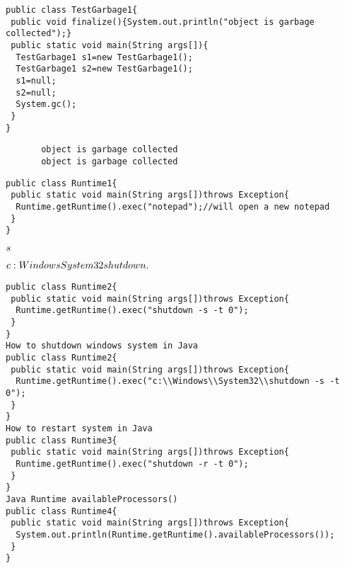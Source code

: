 \documentclass{book}
\def\lthtmlcheckvsize{\ifdim\ht\sizebox<\vsize 
  \ifdim\wd\sizebox<\hsize\expandafter\hfill\fi \expandafter\vfill
  \else\expandafter\vss\fi}%
\begin{document}
{\newpage\clearpage
{}%
\begin{lstlisting}
public class TestGarbage1{  
 public void finalize(){System.out.println("object is garbage collected");}  
 public static void main(String args[]){  
  TestGarbage1 s1=new TestGarbage1();  
  TestGarbage1 s2=new TestGarbage1();  
  s1=null;  
  s2=null;  
  System.gc();  
 }  
}  
\end{lstlisting}%
\lthtmlfigureZ
\lthtmlcheckvsize\clearpage}

{\newpage\clearpage
{}%
\begin{lstlisting}
       object is garbage collected
       object is garbage collected
\end{lstlisting}%
\lthtmlfigureZ
\lthtmlcheckvsize\clearpage}

{\newpage\clearpage
{}%
\begin{lstlisting}
public class Runtime1{  
 public static void main(String args[])throws Exception{  
  Runtime.getRuntime().exec("notepad");//will open a new notepad  
 }  
}  
\end{lstlisting}%
\lthtmlfigureZ
\lthtmlcheckvsize\clearpage}

{\newpage\clearpage
{}%
$\-s$%
\lthtmlindisplaymathZ
\lthtmlcheckvsize\clearpage}

{\newpage\clearpage
{}%
$c:\\Windows\\System32\\shutdown.$%
\lthtmlindisplaymathZ
\lthtmlcheckvsize\clearpage}

{\newpage\clearpage
{}%
\begin{lstlisting}
public class Runtime2{  
 public static void main(String args[])throws Exception{  
  Runtime.getRuntime().exec("shutdown -s -t 0");  
 }  
}  
How to shutdown windows system in Java
public class Runtime2{  
 public static void main(String args[])throws Exception{  
  Runtime.getRuntime().exec("c:\\Windows\\System32\\shutdown -s -t 0");  
 }  
}  
How to restart system in Java
public class Runtime3{  
 public static void main(String args[])throws Exception{  
  Runtime.getRuntime().exec("shutdown -r -t 0");  
 }  
}  
Java Runtime availableProcessors()
public class Runtime4{  
 public static void main(String args[])throws Exception{  
  System.out.println(Runtime.getRuntime().availableProcessors());  
 }  
}  
\end{lstlisting}%
\lthtmlfigureZ
\lthtmlcheckvsize\clearpage}
\end{document}

